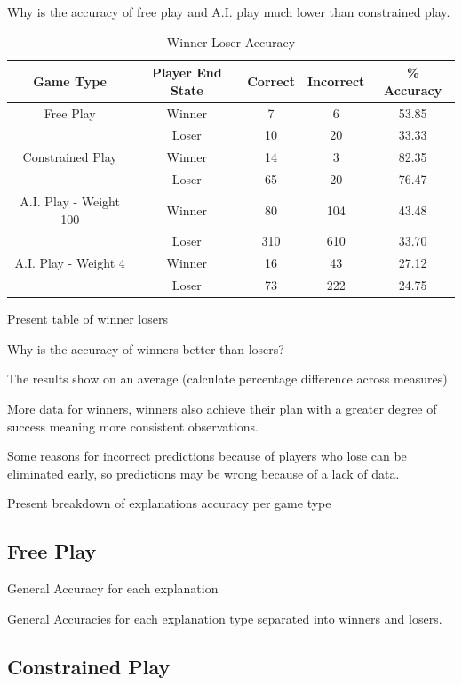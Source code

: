 \documentclass[parskip]{cs4rep}
\begin{document}
Why is the accuracy of free play and A.I. play much lower than constrained play.

\begin{table}[ht]
\centering
\begin{tabular}{|c|c|c|c|c|}
\hline 
\textbf{Game Type} & \textbf{Player End State} & \textbf{Correct} & \textbf{Incorrect} & \textbf{\% Accuracy} \\ 
\hline 
Free Play & Winner & 7 & 6 & 53.85 \\ 
& Loser & 10 & 20 & 33.33 \\ 
\hline 
Constrained Play & Winner & 14 & 3 & 82.35 \\ 
& Loser & 65 & 20 & 76.47 \\ 
\hline
A.I. Play - Weight 100 & Winner & 80 & 104 & 43.48 \\ 
& Loser & 310 & 610 & 33.70 \\  
\hline
A.I. Play - Weight 4 & Winner & 16 & 43 & 27.12 \\ 
& Loser & 73 & 222 & 24.75 \\ 
\hline
\end{tabular}
\caption{Winner-Loser Accuracy}
\label{table:winner-loser-accuracy}
\end{table}

Present table of winner losers

Why is the accuracy of winners better than losers?

The results show on an average (calculate percentage difference across measures)


More data for winners, winners also achieve their plan with a greater degree of success meaning more consistent observations.

Some reasons for incorrect predictions because of players who lose can be eliminated early, so predictions may be wrong because of a lack of data.

Present breakdown of explanations accuracy per game type

\subsection{Free Play}

General Accuracy for each explanation

General Accuracies for each explanation type separated into winners and losers.

\subsection{Constrained Play}
\end{document}
